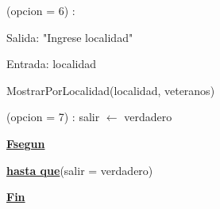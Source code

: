 \documentclass{article}
\begin{document}
    \hspace{12mm}(opcion = 6) : 
    
        \hspace{16mm}Salida: "Ingrese localidad"

        \hspace{16mm}Entrada: localidad

        \hspace{16mm}MostrarPorLocalidad(localidad, veteranos)

    \hspace{12mm}(opcion = 7) : salir $\leftarrow$ verdadero

    \hspace{8mm}\underline{\textbf{Fsegun}}

    \hspace{4mm}\underline{\textbf{hasta que}}(salir = verdadero)



    \underline{\textbf{Fin}}
\end{document}
